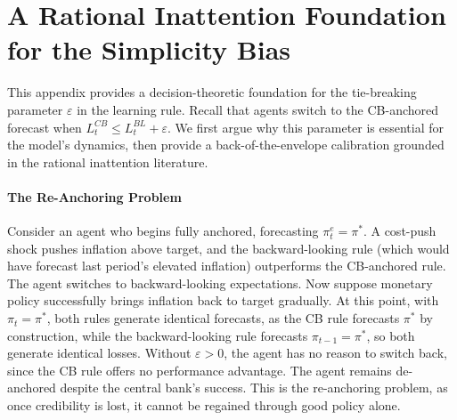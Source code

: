 \documentclass[10pt]{article}
\begin{document}

\section{A Rational Inattention Foundation for the Simplicity Bias}
\label{app:entropy}

This appendix provides a decision-theoretic foundation for the tie-breaking parameter $\varepsilon$ in the learning rule. Recall that agents switch to the CB-anchored forecast when $L^{CB}_t \leq L^{BL}_t + \varepsilon$. We first argue why this parameter is essential for the model's dynamics, then provide a back-of-the-envelope calibration grounded in the rational inattention literature.

\paragraph{The Re-Anchoring Problem} Consider an agent who begins fully anchored, forecasting $\pi^e_t = \pi^*$. A cost-push shock pushes inflation above target, and the backward-looking rule (which would have forecast last period's elevated inflation) outperforms the CB-anchored rule. The agent switches to backward-looking expectations. Now suppose monetary policy successfully brings inflation back to target gradually. At this point, with $\pi_t = \pi^*$, both rules generate identical forecasts, as the CB rule forecasts $\pi^*$ by construction, while the backward-looking rule forecasts $\pi_{t-1} = \pi^*$, so both generate identical losses. Without $\varepsilon > 0$, the agent has no reason to switch back, since the CB rule offers no performance advantage. The agent remains de-anchored despite the central bank's success. This is the re-anchoring problem, as once credibility is lost, it cannot be regained through good policy alone.
\end{document}
